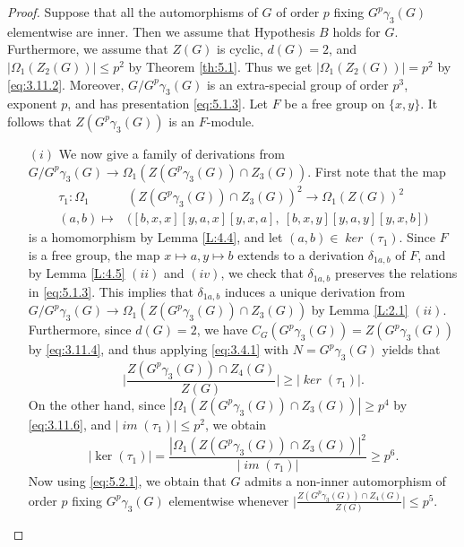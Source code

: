 \documentclass[preprint,sort&compress,12pt]{elsarticle}
\theoremstyle{definition}
\numberwithin{equation}{theorem}
\DeclareMathOperator{\Ker}{\mathit{ker}}
\DeclareMathOperator{\im}{\mathit{im}}
\begin{document}
\begin{proof} 
Suppose that all the automorphisms of $G$ of order $p$ fixing $G^p\gamma_3(G)$ elementwise are inner. Then we assume that Hypothesis $B$ holds for $G$. Furthermore, we assume that $Z(G)$ is cyclic, $d(G)=2$, and $|\Omega_1(Z_2(G))|\le p^2$ by Theorem \ref{th:5.1}. Thus we get $|\Omega_1(Z_2(G))|=p^2$ by \eqref{eq:3.11.2}. Moreover, $G/G^p\gamma_3(G)$ is an extra-special group of order $p^3$, exponent $p$, and has presentation \eqref{eq:5.1.3}. Let $F$ be a free group on $\{x, y\}$. It follows that $Z(G^p\gamma_3(G))$ is an $F$-module.
\begin{itemize}
\item [$(i)$] We now give a family of derivations from $G/G^p\gamma_3(G)\rightarrow \Omega_1(Z(G^p\gamma_3(G))\cap Z_3(G))$. First note that the map 
\begin{align*}
\tau_1: \Omega_1&(Z(G^p\gamma_3(G))\cap Z_3(G))^2\rightarrow \Omega_1(Z(G))^2\\
(a, b)\mapsto &\big([b, x, x][y, a, x][y, x, a],\ [b, x, y][y, a, y][y, x, b]\big)
\end{align*}
\noindent is a homomorphism by Lemma \ref{L:4.4}, and let $(a, b)\in \Ker(\tau_1)$. Since $F$ is a free group, the map $x\mapsto a, y\mapsto b$ extends to a derivation $\delta_{1 a, b}$ of $F$, and by Lemma \ref{L:4.5} $(ii)$ and $(iv)$, we check that $\delta_{1 a, b}$ preserves the relations in \eqref{eq:5.1.3}. This implies that $\delta_{1a, b}$ induces a unique derivation from $G/G^p\gamma_3(G)\rightarrow \Omega_1(Z(G^p\gamma_3(G))\cap Z_3(G))$ by Lemma \ref{L:2.1} $(ii)$. Furthermore, since $d(G)=2$, we have $C_G(G^p\gamma_3(G))=Z(G^p\gamma_3(G))$ by \eqref{eq:3.11.4}, and thus applying \eqref{eq:3.4.1} with $N=G^p\gamma_3(G)$ yields that
\begin{equation}\label{eq:5.2.1}
\bigg|\frac{Z(G^p\gamma_3(G))\cap Z_4(G)}{Z(G)}\bigg|\ge |\Ker(\tau_1)|.
\end{equation}
\noindent On the other hand, since $|\Omega_1(Z(G^p\gamma_3(G))\cap Z_3(G))|\ge p^4$ by \eqref{eq:3.11.6}, and $|\im(\tau_1)|\le p^2$, we obtain
\begin{equation*}
|\ker(\tau_1)|= \frac{|\Omega_1(Z(G^p\gamma_3(G))\cap Z_3(G))|^2}{|\im(\tau_1)|}\ge p^6.
\end{equation*}
\noindent Now using \eqref{eq:5.2.1}, we obtain that $G$ admits a non-inner automorphism of order $p$ fixing $G^p\gamma_3(G)$ elementwise whenever $\bigg|\frac{Z(G^p\gamma_3(G))\cap Z_4(G)}{Z(G)}\bigg|\le p^5$.


\end{itemize}
\end{proof}
\end{document}
